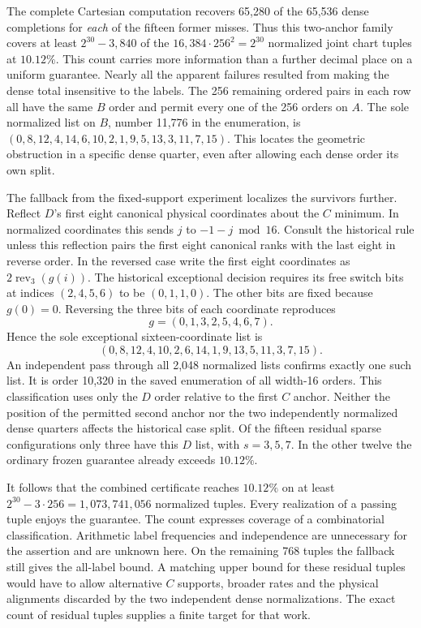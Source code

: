 \documentclass[12pt,letterpaper]{article}
\begin{document}
The complete Cartesian computation recovers 65,280 of the 65,536 dense completions for \emph{each} of the fifteen former misses. Thus this two-anchor family covers at least \(2^{30}-3{,}840\) of the \(16{,}384\cdot256^2=2^{30}\) normalized joint chart tuples at \(10.12\%\). This count carries more information than a further decimal place on a uniform guarantee. Nearly all the apparent failures resulted from making the dense total insensitive to the labels. The 256 remaining ordered pairs in each row all have the same \(B\) order and permit every one of the 256 orders on \(A\). The sole normalized list on \(B\), number 11,776 in the enumeration, is \((0,8,12,4,14,6,10,2,1,9,5,13,3,11,7,15)\). This locates the geometric obstruction in a specific dense quarter, even after allowing each dense order its own split.

The fallback from the fixed-support experiment localizes the survivors further. Reflect \(D\)'s first eight canonical physical coordinates about the \(C\) minimum. In normalized coordinates this sends \(j\) to \(-1-j\bmod16\). Consult the historical rule unless this reflection pairs the first eight canonical ranks with the last eight in reverse order. In the reversed case write the first eight coordinates as \(2\operatorname{rev}_3(g(i))\). The historical exceptional decision requires its free switch bits at indices \((2,4,5,6)\) to be \((0,1,1,0)\). The other bits are fixed because \(g(0)=0\). Reversing the three bits of each coordinate reproduces
\[
    g=(0,1,3,2,5,4,6,7).
\]
Hence the sole exceptional sixteen-coordinate list is
\[
 (0,8,12,4,10,2,6,14,1,9,13,5,11,3,7,15).
\]
An independent pass through all 2,048 normalized lists confirms exactly one such list. It is order 10,320 in the saved enumeration of all width-16 orders. This classification uses only the \(D\) order relative to the first \(C\) anchor. Neither the position of the permitted second anchor nor the two independently normalized dense quarters affects the historical case split. Of the fifteen residual sparse configurations only three have this \(D\) list, with \(s=3,5,7\). In the other twelve the ordinary frozen guarantee already exceeds \(10.12\%\).

It follows that the combined certificate reaches \(10.12\%\) on at least \(2^{30}-3\cdot256=1{,}073{,}741{,}056\) normalized tuples. Every realization of a passing tuple enjoys the guarantee. The count expresses coverage of a combinatorial classification. Arithmetic label frequencies and independence are unnecessary for the assertion and are unknown here. On the remaining 768 tuples the fallback still gives the all-label bound. A matching upper bound for these residual tuples would have to allow alternative \(C\) supports, broader rates and the physical alignments discarded by the two independent dense normalizations. The exact count of residual tuples supplies a finite target for that work.
\end{document}
